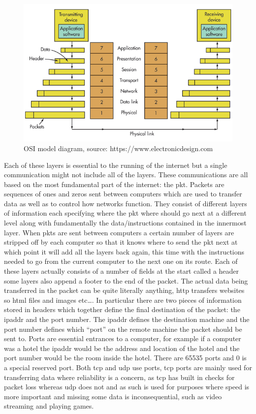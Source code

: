 \documentclass[titlepage]{article}
\begin{document}
\begin{figure}[H]
  \centering
  \includegraphics[width=\textwidth]{osi_model.png}
  \caption{%
    OSI model diagram, source: https://www.electronicdesign.com
  }\label{osi_model}
\end{figure}
Each of these layers is essential to the running of the internet but a single communication might 
not include all of the layers. These communications are all based on the most fundamental part of 
the internet: the \gls{pkt}. Packets are sequences of ones and zeros sent between computers which 
are used to transfer data as well as to control how networks function. They consist of different 
layers of information each specifying where the \gls{pkt} where should go next at a different level 
along with fundamentally the data/instructions contained in the innermost layer. When \glspl{pkt} 
are sent between computers a certain number of layers are stripped off by each computer so that it 
knows where to send the \gls{pkt} next at which point it will add all the layers back again, this 
time with the instructions needed to go from the current computer to the next one on its route. Each 
of these layers actually consists of a number of fields at the start called a \gls{header} some 
layers also append a footer to the end of the packet. The actual data being transferred in the 
packet can be quite literally anything, \gls{http} transfers websites so \gls{html} files and images 
etc\ldots. In particular there are two pieces of information stored in headers which together define 
the final destination of the packet: the \gls{ipaddr} and the \gls{port} number. The \gls{ipaddr} 
defines the destination machine and the \gls{port} number defines which ``port'' on the remote 
machine the packet should be sent to. Ports are essential entrances to a computer, for example if a 
computer was a hotel the \gls{ipaddr} would be the address and location of the hotel and the 
\gls{port} number would be the room inside the hotel. There are 65535 \glspl{port} and 0 is a 
special reserved port. Both \gls{tcp} and \gls{udp} use \glspl{port}, \gls{tcp} \glspl{port} are 
mainly used for transferring data where reliability is a concern, as \gls{tcp} has built in checks 
for packet loss whereas \gls{udp} does not and as such is used for purposes where speed is more 
important and missing some data is inconsequential, such as video streaming and playing games. 
\end{document}
